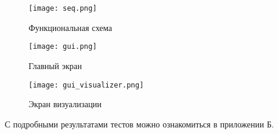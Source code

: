 \par\vspace{1em}
\begin{figure}[H]
    \centering
    \texttt{[image: seq.png]}
    \caption{Функциональная схема}
\end{figure}
\par\vspace{1em}
\begin{figure}[H]
    \centering
    \texttt{[image: gui.png]}
    \caption{Главный экран}
\end{figure}
\par\vspace{1em}
\begin{figure}[H]
    \centering
    \texttt{[image: gui\_visualizer.png]}
    \caption{Экран визуализации}
\end{figure}

С подробными результатами тестов можно ознакомиться в приложении Б.